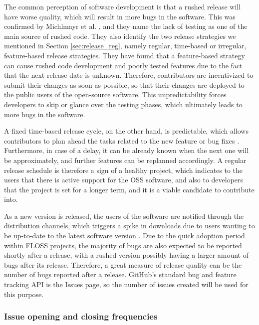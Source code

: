 The common perception of software development is that a rushed release will have worse quality, which will result in more bugs in the software. This was confirmed by Michlmayr et al. \cite{michlmayrWhyHowShould2015}, and they name the lack of testing as one of the main source of rushed code. They also identify the two release strategies we mentioned in Section \ref{sec:release_reg}, namely regular, time-based or irregular, feature-based release strategies. They have found that a feature-based strategy can cause rushed code development and poorly tested features due to the fact that the next release date is unknown. Therefore, contributors are incentivized to submit their changes as soon as possible, so that their changes are deployed to the public users of the open-source software. This unpredictability forces developers to skip or glance over the testing phases, which ultimately leads to more bugs in the software.

A fixed time-based release cycle, on the other hand, is predictable, which allows contributors to plan ahead the tasks related to the new feature or bug fixes \cite{michlmayrWhyHowShould2015}. Furthermore, in case of a delay, it can be already known when the next one will be approximately, and further features can be replanned accordingly. A regular release schedule is therefore a sign of a healthy project, which indicates to the users that there is active support for the OSS software, and also to developers that the project is set for a longer term, and it is a viable candidate to contribute into.

As a new version is released, the users of the software are notified through the distribution channels, which triggers a spike in downloads due to users wanting to be up-to-date to the latest software version \cite{khomhFasterReleasesImprove2012}. Due to the quick adoption period within FLOSS projects, the majority of bugs are also expected to be reported shortly after a release, with a rushed version possibly having a larger amount of bugs after its release. Therefore, a great measure of release quality can be the number of bugs reported after a release. GitHub's standard bug and feature tracking API is the Issues page, so the number of issues created will be used for this purpose. 

\subsubsection{Issue opening and closing frequencies}

